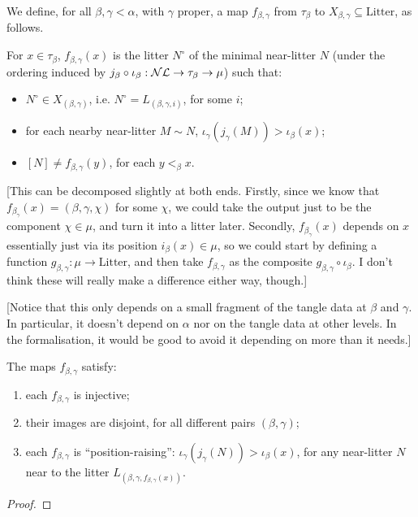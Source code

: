 \begin{definition}
\label {def:f-map}
\leanok
We define, for all $\beta,\gamma < \alpha$, with $\gamma$ proper, a map $f_{\beta,\gamma}$ from $\tau_\beta$ to $X_{\beta,\gamma} \subseteq \mathrm{Litter}$, as follows.

For $x \in \tau_\beta$, $f_{\beta,\gamma}(x)$ is the litter $N^\circ$ of the minimal near-litter $N$ (under the ordering induced by $j_\beta \circ \iota_\beta : \mathcal{NL} \to \tau_\beta \to \mu$) such that:
\begin{itemize}
  \item $N^\circ\in X_{(\beta,\gamma)}$, i.e. $N^\circ = L_{(\beta,\gamma,i)}$, for some $i$;
  \item for each nearby near-litter $M \sim N$, $\iota_\gamma(j_\gamma(M)) >\iota_\beta(x)$;
  \item $[N] \neq f_{\beta,\gamma}(y)$, for each $y <_\beta x$.
\end{itemize}

[This can be decomposed slightly at both ends.  Firstly, since we know that $f_{\beta_\gamma}(x) = (\beta,\gamma,\chi)$ for some $\chi$, we could take the output just to be the component $\chi \in \mu$, and turn it into a litter later.  Secondly, $f_{\beta_\gamma}(x)$ depends on $x$ essentially just via its position $i_\beta(x) \in \mu$, so we could start by defining a function $g_{\beta,\gamma} : \mu \to \mathrm{Litter}$, and then take $f_{\beta,\gamma}$ as the composite $g_{\beta,\gamma} \circ \iota_\beta$.  I don’t think these will really make a difference either way, though.]

[Notice that this only depends on a small fragment of the tangle data at $\beta$ and $\gamma$. In particular, it doesn’t depend on $\alpha$ nor on the tangle data at other levels. In the formalisation, it would be good to avoid it depending on more than it needs.]
\end{definition}

\begin{lemma}
  \label{lem:f-map-properties}
  \leanok
  The maps $f_{\beta,\gamma}$ satisfy:
  \begin{enumerate}
  \item each $f_{\beta,\gamma}$ is injective;
  \item their images are disjoint, for all different pairs $(\beta,\gamma)$;
  \item each $f_{\beta,\gamma}$ is “position-raising”: $\iota_\gamma(j_\gamma(N)) > \iota_\beta(x)$, for any near-litter $N$ near to the litter $L_{(\beta,\gamma,f_{\beta,\gamma}(x))}$.
  \end{enumerate}
\end{lemma}
\begin{proof}\leanok\end{proof}

